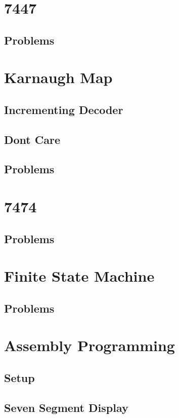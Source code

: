 \documentclass[journal]{IEEEtran}
\begin{document}
\section{7447}

\subsection{Problems}


\newpage
\section{Karnaugh Map}
\subsection{ Incrementing Decoder}

\subsection{Dont Care}

\subsection{Problems}

\newpage
\section{7474}

\subsection{Problems}

\newpage
\section{Finite State Machine}

\subsection{Problems}

\newpage
\section{Assembly Programming}
\subsection{Setup}

\subsection{Seven Segment Display}

\end{document}
